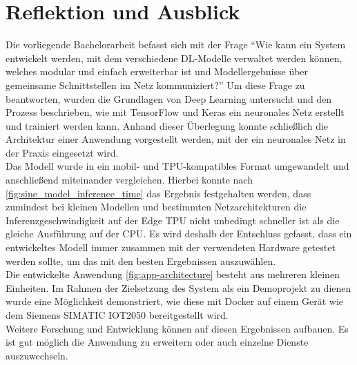 \chapter{Reflektion und Ausblick}
Die vorliegende Bachelorarbeit befasst sich mit der Frage
\enquote{Wie kann ein System entwickelt werden, mit dem verschiedene DL-Modelle
verwaltet werden können, welches modular und einfach erweiterbar ist
und Modellergebnisse über gemeinsame Schnittstellen im Netz kommuniziert?}
Um diese Frage zu beantworten, wurden
die Grundlagen von Deep Learning untersucht
und den Prozess beschrieben, wie mit TensorFlow und Keras
ein neuronales Netz erstellt und trainiert werden kann.
Anhand dieser Überlegung konnte schließlich die Architektur einer Anwendung
vorgestellt werden, mit der ein neuronales Netz in der Praxis eingesetzt wird.\\[8pt]
Das Modell wurde in ein mobil- und TPU-kompatibles Format umgewandelt
und anschließend miteinander vergleichen.
Hierbei konnte nach \autoref{fig:sine_model_inference_time}
das Ergebnis festgehalten werden,
dass zumindest bei kleinen Modellen und bestimmten Netzarchitekturen
die Inferenzgeschwindigkeit
auf der Edge TPU nicht unbedingt schneller ist als die gleiche Ausführung auf der CPU.
Es wird deshalb der Entschluss gefasst, dass
ein entwickeltes Modell immer zusammen mit der verwendeten Hardware getestet
werden sollte, um das mit den besten Ergebnissen auszuwählen.\\[8pt]
Die entwickelte Anwendung \eqref{fig:app-architecture} besteht aus mehreren kleinen
Einheiten. Im Rahmen der Zielsetzung des System als ein Demoprojekt zu dienen
wurde eine Möglichkeit demonstriert,
wie diese mit Docker auf einem Gerät wie dem Siemens
SIMATIC IOT2050 bereitgestellt wird.\\[8pt]
Weitere Forschung und Entwicklung können auf diesen Ergebnissen
aufbauen. Es ist gut möglich die Anwendung zu erweitern oder
auch einzelne Dienste auszuwechseln.
